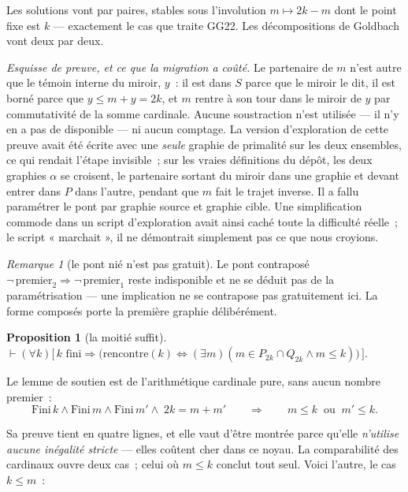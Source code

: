 \documentclass[11pt]{article}
\newtheorem{proposition}{Proposition}
\theoremstyle{remark}\newtheorem{remarque}{Remarque}
\begin{document}
Les solutions vont par paires, stables sous l'involution $m \mapsto 2k - m$ dont le point
fixe est $k$ --- exactement le cas que traite GG22. Les décompositions de Goldbach vont
deux par deux.

\emph{Esquisse de preuve, et ce que la migration a coûté.} Le partenaire de $m$ n'est
autre que le témoin interne du miroir, $y$~: il est dans $S$ parce que le miroir le dit,
il est borné parce que $y \le m + y = 2k$, et $m$ rentre à son tour dans le miroir de $y$
par commutativité de la somme cardinale. Aucune soustraction n'est utilisée --- il n'y en
a pas de disponible --- ni aucun comptage. La version d'exploration de cette preuve avait
été écrite avec une \emph{seule} graphie de primalité sur les deux ensembles, ce qui
rendait l'étape invisible~; sur les vraies définitions du dépôt, les deux graphies
$\alpha$ se croisent, le partenaire sortant du miroir dans une graphie et devant entrer
dans $P$ dans l'autre, pendant que $m$ fait le trajet inverse. Il a fallu paramétrer le
pont par graphie source et graphie cible. Une simplification commode dans un script
d'exploration avait ainsi caché toute la difficulté réelle~; le script « marchait », il
ne démontrait simplement pas ce que nous croyions.

\begin{remarque}[le pont nié n'est pas gratuit]
Le pont contraposé $\neg\,\mathrm{premier}_2 \Rightarrow \neg\,\mathrm{premier}_1$ reste
indisponible et ne se déduit pas de la paramétrisation --- une implication ne se
contrapose pas gratuitement ici. La forme composés porte la première graphie
délibérément.
\end{remarque}

\begin{proposition}[la moitié suffit]
$\vdash (\forall k)\bigl[\,k \text{ fini} \Rightarrow
\bigl(\mathrm{rencontre}(k) \Leftrightarrow (\exists m)(m \in P_{2k} \cap Q_{2k} \wedge m \le k)\bigr)\,\bigr].$
\end{proposition}

Le lemme de soutien est de l'arithmétique cardinale pure, sans aucun nombre premier~:
\[
\mathrm{Fini}\,k \wedge \mathrm{Fini}\,m \wedge \mathrm{Fini}\,m'
\wedge\; 2k = m + m'
\qquad\Longrightarrow\qquad
m \le k \;\;\text{ou}\;\; m' \le k .
\]

Sa preuve tient en quatre lignes, et elle vaut d'être montrée parce qu'elle
\emph{n'utilise aucune inégalité stricte} --- elles coûtent cher dans ce noyau. La
comparabilité des cardinaux ouvre deux cas~; celui où $m \le k$ conclut tout seul. Voici
l'autre, le cas $k \le m$~:
\end{document}
